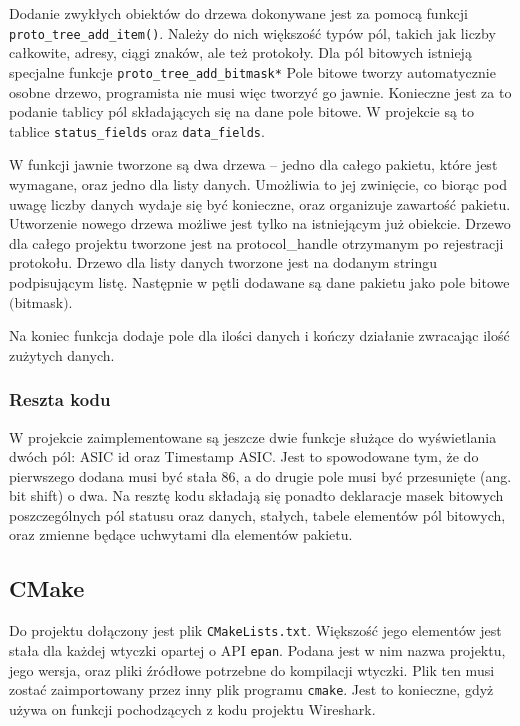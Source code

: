 \documentclass[a4paper, 12pt, twoside, openright]{article}
\begin{document}
Dodanie zwykłych obiektów do drzewa dokonywane jest za pomocą funkcji \texttt{proto\_tree\_add\_item()}.
Należy do nich większość typów pól, takich jak liczby całkowite, adresy, ciągi znaków, ale też protokoły.
Dla pól bitowych istnieją specjalne funkcje \texttt{proto\_tree\_add\_bitmask*} Pole bitowe tworzy automatycznie
osobne drzewo, programista nie musi więc tworzyć go jawnie. Konieczne jest za to podanie tablicy pól składających
się na dane pole bitowe. W projekcie są to tablice \texttt{status\_fields} oraz \texttt{data\_fields}.

W funkcji jawnie tworzone są dwa drzewa -- jedno dla całego pakietu, które jest wymagane, oraz jedno dla listy danych.
Umożliwia to jej zwinięcie, co biorąc pod uwagę liczby danych wydaje się być konieczne, oraz organizuje
zawartość pakietu. Utworzenie nowego drzewa możliwe jest tylko na istniejącym już obiekcie. Drzewo dla całego projektu
tworzone jest na protocol\_handle otrzymanym po rejestracji protokołu. Drzewo dla listy danych tworzone jest na dodanym
stringu podpisującym listę. Następnie w pętli dodawane są dane pakietu jako pole bitowe $($bitmask$)$.

Na koniec funkcja dodaje pole dla ilości danych i kończy działanie zwracając ilość zużytych danych.

\subsubsection{Reszta kodu}
W projekcie zaimplementowane są jeszcze dwie funkcje służące do wyświetlania dwóch pól: ASIC id oraz Timestamp ASIC.
Jest to spowodowane tym, że do pierwszego dodana musi być stała 86, a do drugie pole musi być przesunięte (ang. bit shift)
o dwa. Na resztę kodu składają się ponadto deklaracje masek bitowych poszczególnych pól statusu oraz danych, stałych, tabele
elementów pól bitowych, oraz zmienne będące uchwytami dla elementów pakietu.

\subsection{CMake}

Do projektu dołączony jest plik \texttt{CMakeLists.txt}. Większość jego elementów jest stała dla każdej wtyczki opartej o API \texttt{epan}.
Podana jest w nim nazwa projektu, jego wersja, oraz pliki źródłowe potrzebne do kompilacji wtyczki. Plik ten musi zostać zaimportowany
przez inny plik programu \texttt{cmake}. Jest to konieczne, gdyż używa on funkcji pochodzących z kodu projektu Wireshark.
\end{document}
